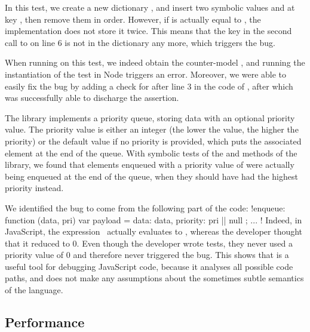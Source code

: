 In this test, we create a new dictionary , and insert two symbolic values  and  at key , then remove them in order.
However, if  is actually equal to , the implementation does not store it twice.
This means that the key in the second call to  on line 6 is not in the dictionary any more, which triggers the bug.

When running \cosette on this test, we indeed obtain the counter-model , and running the instantiation of the test in Node triggers an error.
Moreover, we were able to easily fix the bug by adding a check for  after line 3 in the code of , after which \cosette was successfully able to discharge the assertion.

 The  library implements a priority queue, storing data with an optional priority value.
The priority value is either an integer (the lower the value, the higher the priority) or the default  value if no priority is provided, which puts the associated element at the end of the queue.
With symbolic tests of the  and  methods of the library, we found that elements enqueued with a priority value of  were actually being enqueued at the end of the queue, when they should have had the highest priority instead.

We identified the bug to come from the following part of the code: \jsinline!enqueue: function (data, pri) {var payload = { data: data, priority: pri || null }; ... }!
Indeed, in JavaScript, the expression  actually evaluates to , whereas the developer thought that it reduced to 0.
Even though the developer wrote tests, they never used a priority value of 0 and therefore never triggered the bug.
This shows that \cosette is a useful tool for debugging JavaScript code, because it analyses all possible code paths, and does not make any assumptions about the sometimes subtle semantics of the language.

\subsection{Performance}

